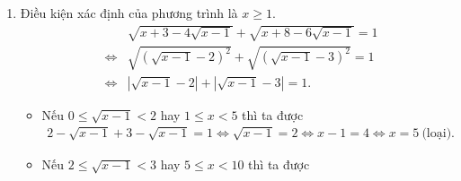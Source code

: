 \begin{vd}
{\begin{enumerate}
			\begin{itemize}
				\item $\sqrt{x+3}=3x-1 \Leftrightarrow \left\{\begin{aligned}&3x-1\geq 0 \\&9x^2-7x-2=0\end{aligned}\right. \Leftrightarrow \left\{\begin{aligned}&x\geq \dfrac{1}{3} \\&\left[\begin{aligned}&x=1 \\&x=-\dfrac{2}{7}\end{aligned}\right.\end{aligned}\right. \Leftrightarrow x=1$.
				\item $\sqrt{x+3}=-3x-1 \Leftrightarrow \left\{\begin{aligned}&-3x-1\geq 0 \\&9x^2+5x-2=0\end{aligned}\right. \Leftrightarrow \left\{\begin{aligned}&x\leq -\dfrac{1}{3} \\&\left[\begin{aligned}&x=\dfrac{-5-\sqrt{97}}{18} \\&x=\dfrac{-5+\sqrt{97}}{18}\end{aligned}\right.\end{aligned}\right. \Leftrightarrow x=-\dfrac{5+\sqrt{97}}{18}$.
			\end{itemize}
			Vậy phương trình đã cho có nghiệm $x=1$, $x=-\dfrac{5+\sqrt{97}}{18}$.
			\item Điều kiện xác định của phương trình là $x\geq 1$.
			\begin{eqnarray*}
				&& \sqrt{x+3-4\sqrt{x-1}} + \sqrt{x+8-6\sqrt{x-1}}=1\\
				&\Leftrightarrow & \sqrt{\left(\sqrt{x-1}-2\right)^2} + \sqrt{\left(\sqrt{x-1}-3\right)^2}=1\\
				&\Leftrightarrow & \left|\sqrt{x-1}-2\right| + \left|\sqrt{x-1}-3\right| = 1.
			\end{eqnarray*}
			\begin{itemize}
				\item Nếu $0\leq \sqrt{x-1}<2$ hay $1\leq x <5$ thì ta được
				\begin{eqnarray*}
					2-\sqrt{x-1}+3-\sqrt{x-1}=1 \Leftrightarrow \sqrt{x-1}=2 \Leftrightarrow x-1=4 \Leftrightarrow x=5 ~\text{(loại)}.
				\end{eqnarray*}
				\item Nếu $2\leq \sqrt{x-1}<3$ hay $5\leq x <10$ thì ta được

\end{itemize}
\end{enumerate}}
\end{vd}
